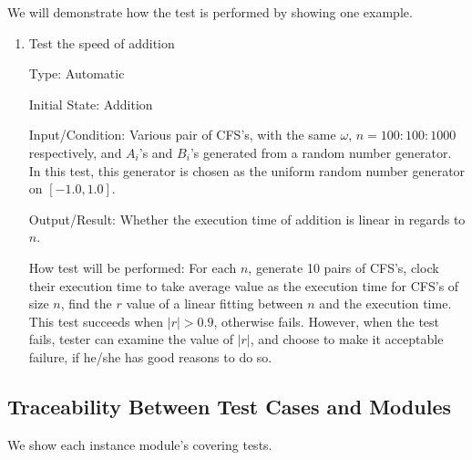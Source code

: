 \documentclass[12pt, titlepage]{article}
\begin{document}
We will demonstrate how the test is performed by showing one example.
\begin{enumerate}
	
	\item{Test the speed of addition\\}
	
	Type: Automatic
	
	Initial State: Addition
	
	Input/Condition: Various pair of CFS's, with the same $\omega$,
        $n=100:100:1000$ respectively, and $A_i$'s and $B_i$'s generated from a
        random number generator. In this test, this generator is chosen as the
        uniform random number generator on $[-1.0, 1.0]$.
	
	Output/Result: Whether the execution time of addition is linear in
        regards to $n$.  
	
	How test will be performed: For each $n$, generate 10 pairs of CFS's,
        clock their execution time to take average value as the execution time
        for CFS's of size $n$, find the $r$ value of a linear fitting between
        $n$ and the execution time. This test succeeds when $|r|>0.9$, otherwise
        fails. However, when the test fails, tester can examine the value of
        $|r|$, and choose to make it acceptable failure, if he/she has good
        reasons to do so.
	
\end{enumerate}



\subsection{Traceability Between Test Cases and Modules}
We show each instance module's covering tests. 
\end{document}
